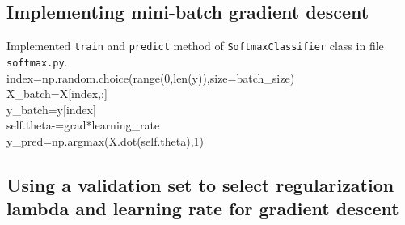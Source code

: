 \documentclass{article}
\begin{document}
\subsection{Implementing mini-batch gradient descent}
Implemented \verb|train| and \verb|predict| method of \verb|SoftmaxClassifier| class in file \verb|softmax.py|.\\[10pt]
index=np.random.choice(range(0,len(y)),size=batch\_size)\\
      X\_batch=X[index,:]\\
      y\_batch=y[index]\\[8pt]
      self.theta-=grad*learning\_rate\\[8pt]
          y\_pred=np.argmax(X.dot(self.theta),1)\\[10pt]
\subsection{Using a validation set to select regularization lambda and learning rate for gradient descent}
\end{document}
